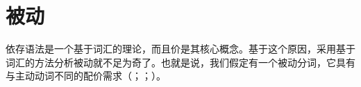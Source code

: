 
\section{被动}
\label{Abschnitt-Passiv-DG}

依存语法是一个基于词汇的理论，而且价是其核心概念。基于这个原因，采用基于词汇的方法分析被动就不足为奇了。也就是说，我们假定有一个被动分词，它具有与主动动词不同的配价需求（\citealp[\S~12]{Hudson90a-u}；\citealp[\S~10.3]{Eroms2000a}；\citealp[--54]{Engel2014a}）。


